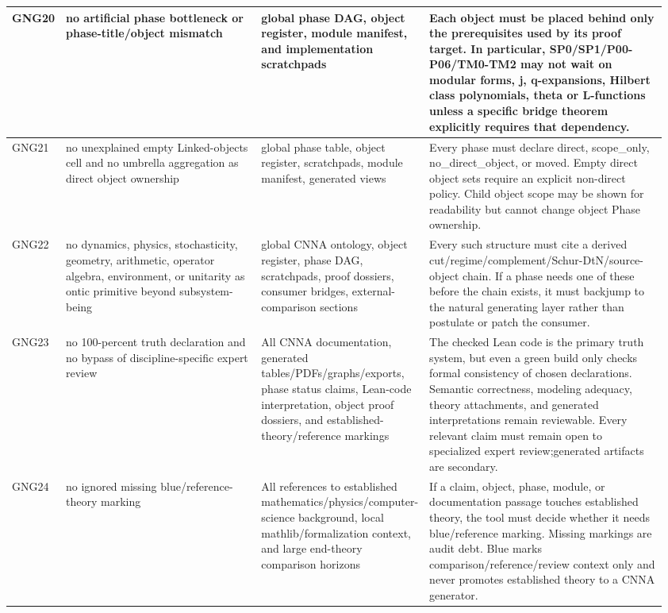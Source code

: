 \begin{longtable}{L{0.045\linewidth} L{0.345\linewidth} L{0.185\linewidth} L{0.39\linewidth}}
\hline
\addlinespace[0.24em]
GNG20 & no artificial phase bottleneck or phase-title/\allowbreak{}object mismatch & global phase DAG, object register, module manifest, and implementation scratchpads & Each object must be placed behind only the prerequisites used by its proof target. In particular, SP0/\allowbreak{}SP1/\allowbreak{}P00-P06/\allowbreak{}TM0-TM2 may not wait on modular forms, j, q-expansions, Hilbert class polynomials, theta or L-functions unless a specific bridge theorem explicitly requires that dependency.\\
\hline
\addlinespace[0.24em]
GNG21 & no unexplained empty Linked-objects cell and no umbrella aggregation as direct object ownership & global phase table, object register, scratchpads, module manifest, generated views & Every phase must declare direct, scope\_only, no\_direct\_object, or moved. Empty direct object sets require an explicit non-direct policy. Child object scope may be shown for readability but cannot change object Phase ownership.\\
\hline
\addlinespace[0.24em]
GNG22 & no dynamics, physics, stochasticity, geometry, arithmetic, operator algebra, environment, or unitarity as ontic primitive beyond subsystem-being & global CNNA ontology, object register, phase DAG, scratchpads, proof dossiers, consumer bridges, external-comparison sections & Every such structure must cite a derived cut/\allowbreak{}regime/\allowbreak{}complement/\allowbreak{}Schur-DtN/\allowbreak{}source-object chain. If a phase needs one of these before the chain exists, it must backjump to the natural generating layer rather than postulate or patch the consumer.\\
\hline
\addlinespace[0.24em]
GNG23 & no 100-percent truth declaration and no bypass of discipline-specific expert review & All CNNA documentation, generated tables/\allowbreak{}PDFs/\allowbreak{}graphs/\allowbreak{}exports, phase status claims, Lean-code interpretation, object proof dossiers, and established-theory/\allowbreak{}reference markings & The checked Lean code is the primary truth system, but even a green build only checks formal consistency of chosen declarations. Semantic correctness, modeling adequacy, theory attachments, and generated interpretations remain reviewable. Every relevant claim must remain open to specialized expert review;\newline generated artifacts are secondary.\\
\hline
\addlinespace[0.24em]
GNG24 & no ignored missing blue/\allowbreak{}reference-theory marking & All references to established mathematics/\allowbreak{}physics/\allowbreak{}computer-science background, local mathlib/\allowbreak{}formalization context, and large end-theory comparison horizons & If a claim, object, phase, module, or documentation passage touches established theory, the tool must decide whether it needs blue/\allowbreak{}reference marking. Missing markings are audit debt. Blue marks comparison/\allowbreak{}reference/\allowbreak{}review context only and never promotes established theory to a CNNA generator.\\

\end{longtable}
